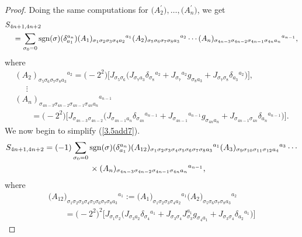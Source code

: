 \documentclass[10pt,a4paper]{amsart}
\numberwithin{equation}{section}
\theoremstyle{definition}
\newcommand{\sgn}{{\rm sgn}}
\begin{document}
\begin{proof}
Doing the same computations for $\bigl(A_2^\prime\bigr),\dots, \bigl(A_n^\prime \bigr)$, we get
\begin{align}\label{3.5add7}
&{S_{4n+1,4n+2}} \\
 &\quad{}= \sum_{\sigma_0 = 0} \sgn(\sigma) (\delta_{a_1}^{a_n})
 ({A_1})_{\sigma_1 \sigma_2 \sigma_3 \sigma_4 a_2}{}^{a_1}
 ({A_2})_{\sigma_5 \sigma_6 \sigma_7 \sigma_8 a_3}{}^{a_2} \cdots
({A_n})_{\sigma_{4n-3} \sigma_{4n-2} \sigma_{4n-1} \sigma_{4n} a_n}{}^{a_{n-1}}, \nonumber
\end{align}
where
\begin{gather*} %
({A_2})_{\sigma_5 \sigma_6 \sigma_7 \sigma_8 a_3}{}^{a_2}
=
\bigl(-2^2\bigr) \bigl[J_{\sigma_5 \sigma_6}
 \bigl(J_{\sigma_7 a_3} \delta_{\sigma_8}{}^{a_2}
 +J_{\sigma_7}{}^{a_2} g_{\sigma_8 a_3}
 + J_{\sigma_7 \sigma_8} \delta_{a_3}{}^{a_2} \bigr) \bigr],
\\ \nonumber
\quad \ \, \vdots \\ \nonumber
 ({A_n})_{\sigma_{4n-3} \sigma_{4n-2} \sigma_{4n-1} \sigma_{4n} a_n} {}^{a_{n-1}} \nonumber\\
\qquad{}= \bigl(-2^2\bigr)
 \bigl[J_{\sigma_{4n-3} \sigma_{4n-2}} \bigl(J_{\sigma_{4n-1} a_n} \delta_{\sigma_{4n}}{}^{a_{n-1}}
 +J_{\sigma_{4n-1}}{}^{a_{n-1}} g_{\sigma_{4n} a_n}
+ J_{\sigma_{4n-1} \sigma_{4n}} \delta_{a_n}{}^{a_{n-1}} \bigr) \bigr]. \nonumber
\end{gather*}
We now begin to simplify (\ref{3.5add7}).
\begin{align*}%
{S_{4n+1,4n+2}}
 = (-1) \sum_{\sigma_0 = 0}{}& \sgn(\sigma) (\delta_{a_1}^{a_n})
({A_{12}})_{\sigma_1 \sigma_2 \sigma_3 \sigma_4 \sigma_5 \sigma_6 \sigma_7 \sigma_8 a_3}{}^{a_1}
 ({A_3})_{\sigma_9 \sigma_{10} \sigma_{11} \sigma_{12} a_4}{}^{a_3}\cdots
\\ \nonumber
&
\times ({A_n})_{\sigma_{4n-3} \sigma_{4n-2} \sigma_{4n-1} \sigma_{4n} a_n}{}^{a_{n-1}},
\end{align*}
where
\begin{gather}
{\bigl({A_{12}}\bigr)_{\sigma_1 \sigma_2 \sigma_3 \sigma_4
\sigma_5 \sigma_6 \sigma_7 \sigma_8 a_3}{}^{a_1}
:= \bigl({A_1}\bigr)_{\sigma_1 \sigma_2 \sigma_3 \sigma_4 a_2}{}^{a_1}
 \bigl({A_2}\bigr)_{\sigma_5 \sigma_6 \sigma_7 \sigma_8 a_3}{}^{a_2} }\nonumber\\
\qquad{}=
\bigl(-2^2\bigr)^2 \bigl[
 J_{\sigma_1 \sigma_2 }
\bigl(J_{\sigma_3 a_2} \delta_{\sigma_4}{}^{a_1}
+ J_{\sigma_3 \sigma_4} J_{\sigma_3}^{a_1}g_{\sigma_4 a_1} +
J_{\sigma_3 \sigma_4} \delta_{a_2}{}^{a_1} \bigr)\bigr]

\end{gather}
\end{proof}
\end{document}
